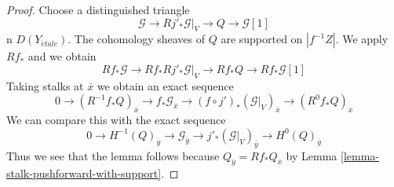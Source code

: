 \documentclass[10pt,a4paper]{amsart}
\theoremstyle{plain}
\theoremstyle{definition}
\theoremstyle{remark}
\numberwithin{equation}{subsection}
\def\etale{{\acute{e}tale}}
\begin{document}
\begin{proof}
Choose a distinguished triangle
$$
\mathcal{G} \to Rj'_*\mathcal{G}|_V \to Q \to \mathcal{G}[1]
$$
n $D(Y_\etale)$. The cohomology sheaves of $Q$
are supported on $|f^{-1}Z|$. We apply $Rf_*$ and we obtain
$$
Rf_*\mathcal{G} \to Rf_*Rj'_*\mathcal{G}|_V \to Rf_*Q
\to Rf_*\mathcal{G}[1]
$$
Taking stalks at $\overline{x}$ we obtain an exact sequence
$$
0 \to
(R^{-1}f_*Q)_{\overline{x}} \to
f_*\mathcal{G}_{\overline{x}} \to
(f \circ j')_*(\mathcal{G}|_V)_{\overline{x}} \to
(R^0f_*Q)_{\overline{x}}
$$
We can compare this with the exact sequence
$$
0 \to
H^{-1}(Q)_{\overline{y}} \to
\mathcal{G}_{\overline{y}} \to
j'_*(\mathcal{G}|_V)_{\overline{y}} \to
H^0(Q)_{\overline{y}}
$$
Thus we see that the lemma follows because
$Q_{\overline{y}} = Rf_*Q_{\overline{x}}$ by
Lemma \ref{lemma-stalk-pushforward-with-support}.
\end{proof}
\end{document}
